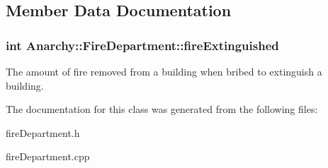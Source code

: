 \subsection{Member Data Documentation}
\hypertarget{classAnarchy_1_1FireDepartment_a859e81aeb1067f5218d9e894d98bceec}{
\subsubsection[{fire\-Extinguished}]{\setlength{\rightskip}{0pt plus 5cm}int Anarchy\-::\-Fire\-Department\-::fire\-Extinguished}}\label{classAnarchy_1_1FireDepartment_a859e81aeb1067f5218d9e894d98bceec}


The amount of fire removed from a building when bribed to extinguish a building. 



The documentation for this class was generated from the following files\-:\begin{DoxyCompactItemize}
\item 
fire\-Department.\-h\item 
fire\-Department.\-cpp\end{DoxyCompactItemize}
